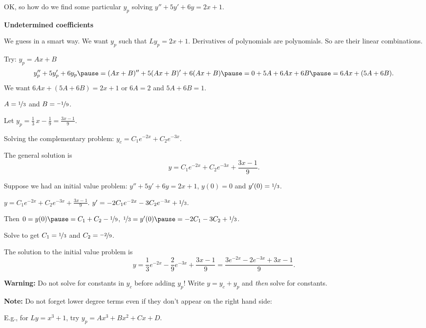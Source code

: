 \documentclass[10pt,aspectratio=169]{beamer}
\begin{document}
\begin{frame}
OK, so how do we find some particular $y_p$ solving
$y'' + 5y'+ 6y = 2x+1$.

\medskip
\pause

\textbf{Undetermined coefficients}

\medskip
\pause

We guess in a smart way.
We want $y_p$ such that $Ly_p = 2x+1$.
\pause
Derivatives of polynomials are polynomials.
\pause
So are their linear combinations.

\medskip
\pause

Try: \quad $y_p = Ax + B$
\pause
\[
y_p'' + 5y_p'+ 6y_p  \pause =
(Ax+B)'' + 5(Ax+B)' + 6(Ax+B)
\pause  = 
0 + 5A + 6Ax + 6B
\pause
= 6Ax+ (5A+6B) .
\]
\pause
We want \quad $6Ax+(5A+6B) = 2x+1$ \quad or \quad $6A=2$ and $5A+6B=1$.

\medskip
\pause

\thus \quad  $A = \nicefrac{1}{3}$ and $B = \nicefrac{-1}{9}$.

\medskip
\pause

Let \quad $\displaystyle y_p = \frac{1}{3}\, x - \frac{1}{9} = \frac{3x-1}{9}$.

\medskip
\pause

Solving the complementary problem:
\quad
$y_c = C_1 e^{-2x} + C_2 e^{-3x}$.

\medskip
\pause

The general solution is
\[
y = C_1 e^{-2x} + C_2 e^{-3x} + \frac{3x-1}{9} .
\]
\end{frame}

\begin{frame}
Suppose we had an initial value problem:
\quad $y'' + 5y'+ 6y = 2x+1$, \quad
$y(0) = 0$ and $y'(0) = \nicefrac{1}{3}$.

\medskip
\pause

\quad $y = C_1 e^{-2x} + C_2 e^{-3x} + \frac{3x-1}{9}$.
\qquad
\pause
$y' = - 2C_1 e^{-2x} - 3C_2 e^{-3x} + \nicefrac{1}{3}$.

\medskip
\pause
Then
$0 = y(0) \pause = C_1 + C_2 -\nicefrac{1}{9}$, \pause \qquad
$\nicefrac{1}{3} = y'(0) \pause = - 2C_1 - 3C_2 + \nicefrac{1}{3}$.
\medskip
\pause

Solve to get $C_1 = \nicefrac{1}{3}$ and $C_2 = \nicefrac{-2}{9}$.

\medskip
\pause

The solution to the initial value problem is
\[
y = \frac{1}{3} e^{-2x} - \frac{2}{9} e^{-3x} + \frac{3x-1}{9} =
\frac{3 e^{-2x} - 2 e^{-3x} + 3x-1}{9} .
\]
\pause

\textbf{Warning:}
Do not solve for constants in $y_c$ before adding $y_p$!
Write $y=y_c+y_p$ and \textit{then} solve for constants.

\medskip
\pause

\textbf{Note:}
Do not forget lower degree terms even if they don't appear on the right
hand side:

\medskip

E.g., for \quad $Ly = x^3+1$, \quad try $y_p = Ax^3+Bx^2+Cx+D$.

\end{frame}
\end{document}
